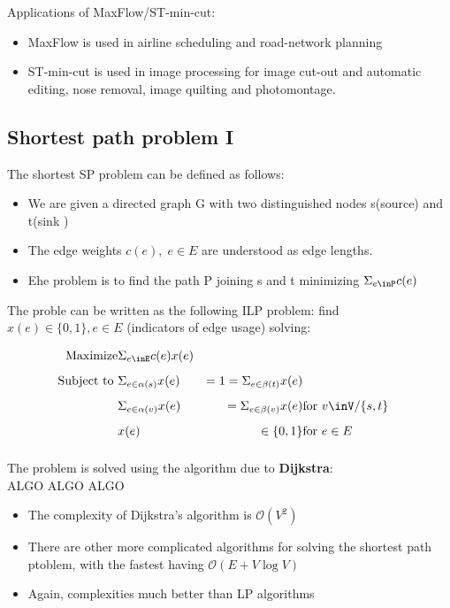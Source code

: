 Applications of MaxFlow/ST-min-cut:
\begin{itemize}
        \item MaxFlow is used in airline scheduling and road-network planning
        \item ST-min-cut is used in image processing for image cut-out and automatic editing, nose removal, image quilting and photomontage.
        
\end{itemize}



\subsection{Shortest path problem I}
{
    The shortest SP problem can be defined as follows:
    \begin{itemize}
            \item We are given a directed graph G with two distinguished nodes s(source) and t(sink )
            \item The edge weights $c(e),\; e \in E$ are understood as edge lengths.
            \item Ehe problem is to find the path P joining s and t minimizing  $\Sigma_{e\inP}c(e)$
            
    \end{itemize}

    The proble can be written as the following ILP problem:
    find $x(e) \in \{0,1\}, e\in E$ (indicators of edge usage) solving:

\begin{equation}
        \begin{aligned}
            \text{Maximize}&\Sigma_{e\inE}c(e)x(e)&\mbox{}\\[1.25ex]
            \text{Subject to }& \Sigma_{e\in\alpha(s)}x(e)&=1 = \Sigma_{e\in\beta(t)}x(e)&\mbox{}\\[1.25ex]
                              & \Sigma_{e\in\alpha(v)}x(e)&= \Sigma_{e\in\beta(v)}x(e)&\mbox{for $v\inV / \{s,t\} $}\\[1.25ex]
            &x(e)&\in \{0,1\}&\mbox{for $e\in E$}\\[1.25ex]
        \end{aligned}
    \end{equation}
}
The problem is solved using the algorithm due to \textbf{Dijkstra}:\\
ALGO ALGO ALGO
\\
\begin{itemize}
        \item The complexity of Dijkstra's algorithm is $\mathcal{O}(V^{2})$
        \item There are other more complicated algorithms for solving the shortest path ptoblem, with the fastest having $\mathcal{O}(E+V\log{V})$
        \item Again, complexities much better than LP algorithms
        
\end{itemize}
